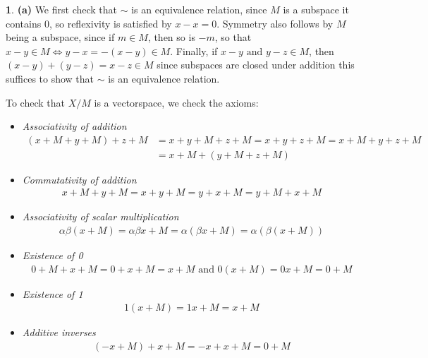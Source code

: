 \documentclass[10.5pt]{article}
\theoremstyle{definition}
\newtheorem{pb}{}
\newcommand{\tand}{\text{ and }}
\begin{document}
        \begin{pb}
            \textbf{(a)} We first check that \(\sim\) is an equivalence relation, since \(M\) is a subspace it contains \(0\), so reflexivity is satisfied by \(x-x = 0\). Symmetry also follows by \(M\) being a subspace, since if \(m \in M\), then so is \(-m\), so that \(x-y \in M \iff y-x = -(x-y) \in M\). Finally, if \(x-y \tand y-z \in M\), then \((x-y) + (y-z) = x-z \in M\) since subspaces are closed under addition this suffices to show that \(\sim\) is an equivalence relation.

            To check that \(X/M\) is a vectorspace, we check the axioms:

            \begin{itemize}
                \item \emph{Associativity of addition}
                \begin{align*}
                    (x + M + y + M) + z + M &= x + y + M + z + M = x + y + z + M = x + M + y + z + M \\
                    &= x + M + (y + M + z + M)
                \end{align*}
                \item \emph{Commutativity of addition}
                \begin{align*}
                    x + M + y + M = x + y + M = y + x + M = y + M + x + M
                \end{align*}
                \item \emph{Associativity of scalar multiplication}
                \begin{align*}
                    \alpha \beta (x + M) = \alpha \beta x + M = \alpha(\beta x + M) = \alpha(\beta(x + M))
                \end{align*}
                \item \emph{Existence of 0}
                \begin{align*}
                    0 + M + x + M = 0 + x + M = x + M \tand 0(x + M) = 0x + M = 0 + M
                \end{align*}
                \item \emph{Existence of 1}
                \begin{align*}
                    1(x + M) = 1x + M = x + M
                \end{align*}
                \item \emph{Additive inverses}
                \begin{align*}
                    (-x + M) + x + M = -x + x + M = 0 + M

\end{align*}
\end{itemize}
\end{pb}
\end{document}
